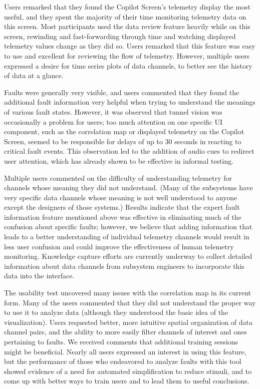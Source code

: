 Users remarked that they found the Copilot Screen's telemetry display the most useful, and they spent the majority of their time monitoring telemetry data on this screen. Most participants used the data review feature heavily while on this screen, rewinding and fast-forwarding through time and watching displayed telemetry values change as they did so. Users remarked that this feature was easy to use and excellent for reviewing the flow of telemetry. However, multiple users expressed a desire for time series plots of data channels, to better see the history of data at a glance.

Faults were generally very visible, and users commented that they found the additional fault information very helpful when trying to understand the meanings of various fault states. However, it was observed that tunnel vision was occasionally a problem for users; too much attention on one specific UI component, such as the correlation map or displayed telemetry on the Copilot Screen, seemed to be responsible for delays of up to 30 seconds in reacting to critical fault events. This observation led to the addition of audio cues to redirect user attention, which has already shown to be effective in informal testing.

Multiple users commented on the difficulty of understanding telemetry for channels whose meaning they did not understand. (Many of the subsystems have very specific data channels whose meaning is not well understood to anyone except the designers of those systems.) Results indicate that the expert fault information feature mentioned above was effective in eliminating much of the confusion about specific faults; however, we believe that adding information that leads to a better understanding of individual telemetry channels would result in less user confusion and could improve the effectiveness of human telemetry monitoring. Knowledge capture efforts are currently underway to collect detailed information about data channels from subsystem engineers to incorporate this data into the interface.

The usability test uncovered many issues with the correlation map in its current form. Many of the users commented that they did not understand the proper way to use it to analyze data (although they understood the basic idea of the visualization). Users requested better, more intuitive spatial organization of data channel pairs, and the ability to more easily filter channels of interest and ones pertaining to faults. We received comments that additional training sessions might be beneficial. Nearly all users expressed an interest in using this feature, but the performance of those who endeavored to analyze faults with this tool showed evidence of a need for automated simplification to reduce stimuli, and to come up with better ways to train users and to lead them to useful conclusions.

